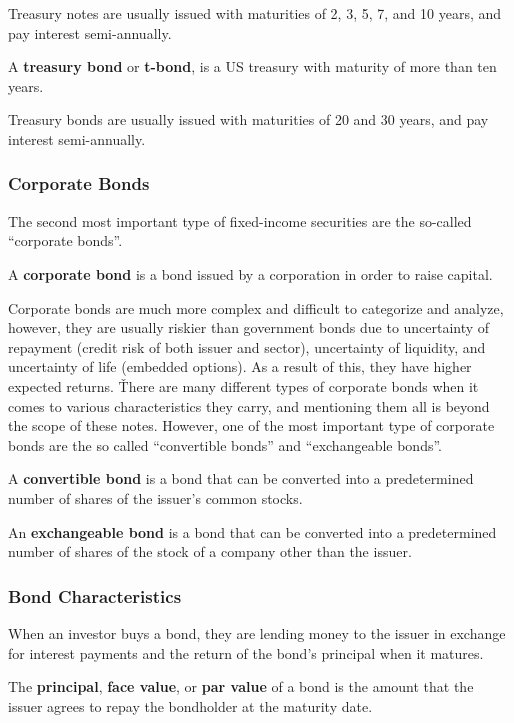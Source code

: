 Treasury notes are usually issued with maturities of 2, 3, 5, 7, and 10 years, and pay interest semi-annually.

A \textbf{treasury bond} or \textbf{t-bond}, is a US treasury with maturity of more than ten years.
\ed

Treasury bonds are usually issued with maturities of 20 and 30 years, and pay interest semi-annually.

\subsubsection{Corporate Bonds}

The second most important type of fixed-income securities are the so-called ``corporate bonds''.

A \textbf{corporate bond} is a bond issued by a corporation in order to raise capital.
\ed

Corporate bonds are much more complex and difficult to categorize and analyze, however, they are usually riskier than
government bonds due to uncertainty of repayment (credit risk of both issuer and sector), uncertainty of liquidity,
and uncertainty of life (embedded options). As a result of this, they have higher expected returns. \v

There are many different types of corporate bonds when it comes to various characteristics they carry, and mentioning
them all is beyond the scope of these notes. However, one of the most important type of corporate bonds are the so
called ``convertible bonds'' and ``exchangeable bonds''.

A \textbf{convertible bond} is a bond that can be converted into a predetermined number of shares of the issuer's
common stocks.
\ed

An \textbf{exchangeable bond} is a bond that can be converted into a predetermined number of shares of the stock
of a company other than the issuer.
\ed

\subsubsection{Bond Characteristics}

When an investor buys a bond, they are lending money to the issuer in exchange for interest payments and the return of
the bond's principal when it matures.

The \textbf{principal}, \textbf{face value}, or \textbf{par value} of a bond is the amount that the issuer agrees to
repay the bondholder at the maturity date.
\ed

